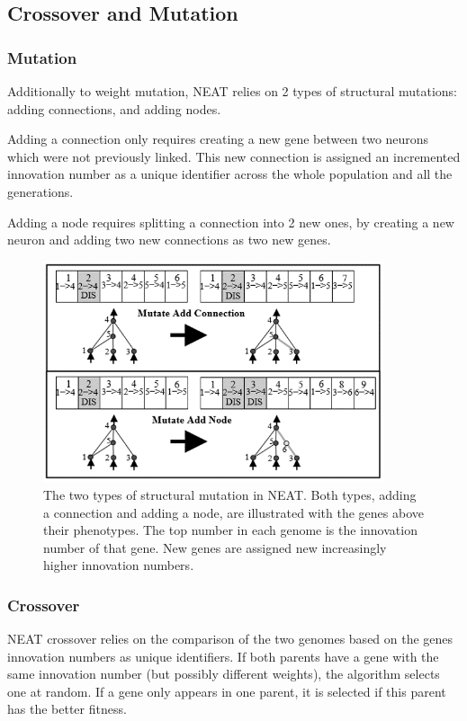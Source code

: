 \subsection{Crossover and Mutation}

\subsubsection{Mutation}
Additionally to weight mutation, NEAT relies on 2 types of structural mutations: adding connections, and adding nodes.

Adding a connection only requires creating a new gene between two neurons which were not previously linked. This new connection is assigned an incremented innovation number as a unique identifier across the whole population and all the generations.

Adding a node requires splitting a connection into 2 new ones, by creating a new neuron and adding two new connections as two new genes. 

\begin{figure}[H]
\centering
\captionsetup{justification=centering,margin=2cm}
\includegraphics[width=10cm]{images/neat_mut.png}
\caption{The two types of structural mutation in NEAT. Both types, adding a connection and adding a node, are illustrated with the genes above their phenotypes.  The top number in each genome is  the innovation number of that gene. New genes are assigned new increasingly higher innovation numbers. \cite{NEAT_2}}
 \label{NEAT_network}
\end{figure}

\subsubsection{Crossover}
NEAT crossover relies on the comparison of the two genomes based on the genes innovation numbers as unique identifiers. If both parents have a gene with the same innovation number (but possibly different weights), the algorithm selects one at random. If a gene only appears in one parent, it is selected if this parent has the better fitness.

